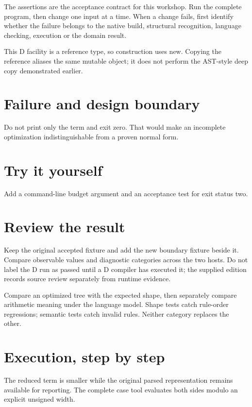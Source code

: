 The assertions are the acceptance contract for this workshop. Run the complete program, then change one input at a time. When a change fails, first identify whether the failure belongs to the native build, structural recognition, language checking, execution or the domain result.

\clearpage
{}
This D facility is a reference type, so construction uses new. Copying the reference aliases the same mutable object; it does not perform the AST-style deep copy demonstrated earlier.


\section*{Failure and design boundary}
Do not print only the term and exit zero. That would make an incomplete optimization indistinguishable from a proven normal form.

\section*{Try it yourself}
Add a command-line budget argument and an acceptance test for exit status two.

\section*{Review the result}
Keep the original accepted fixture and add the new boundary fixture beside it. Compare observable values and diagnostic categories across the two hosts. Do not label the D run as passed until a D compiler has executed it; the supplied edition records source review separately from runtime evidence.

\clearpage
{}
Compare an optimized tree with the expected shape, then separately compare arithmetic meaning under the language model. Shape tests catch rule-order regressions; semantic tests catch invalid rules. Neither category replaces the other.


\section*{Execution, step by step}
The reduced term is smaller while the original parsed representation remains available for reporting. The complete case tool evaluates both sides modulo an explicit unsigned width.

